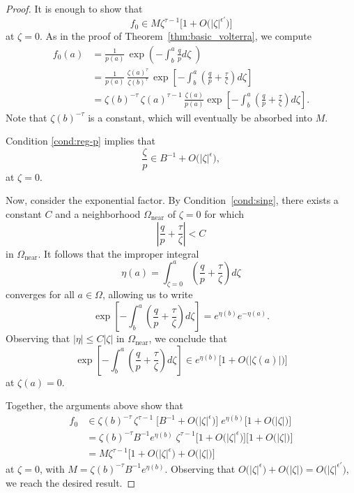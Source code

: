 \documentclass{article}
\theoremstyle{definition}
\theoremstyle{plain}
\newcommand{\solproto}{f_0}
\newcommand{\domain}{\Omega}
\newcommand{\near}{\Omega_\text{near}}
\begin{document}
\begin{proof}
It is enough to show that
\[ \solproto \in M\zeta^{\tau-1} \Big[1 + O\big(|\zeta|^{\epsilon'}\big)\Big] \]
at $\zeta = 0$. As in the proof of Theorem~\ref{thm:basic_volterra}, we compute
\begin{align*}
\solproto(a)&=\frac{1}{p(a)}\, \exp\left(-\int_b^a\frac{q}{p} d\zeta\;\right)\\
& = \frac{1}{p(a)}\,\frac{\zeta(a)^{\tau}}{\zeta(b)^{\tau}}\,\exp\left[-\int_b^a \left(\frac{q}{p}+\frac{\tau}{\zeta}\right) d\zeta\right]\\
& = \zeta(b)^{-\tau}\,\zeta(a)^{\tau-1}\,\frac{\zeta(a)}{p(a)} \exp\left[-\int_b^a\left(\frac{q}{p}+\frac{\tau}{\zeta}\right) d\zeta\right].
\end{align*}
Note that $\zeta(b)^{-\tau}$ is a constant, which will eventually be absorbed into $M$.

Condition \eqref{cond:reg-p} implies that
\[ \frac{\zeta}{p} \in B^{-1} + O\big(|\zeta|^{\epsilon}\big), \]
at $\zeta = 0$.

Now, consider the exponential factor. By Condition~\eqref{cond:sing}, there exists a constant $C$ and a neighborhood $\domain_\text{near}$ of $\zeta = 0$ for which
\[ \left| \frac{q}{p}+\frac{\tau}{\zeta} \right| < C \]
in $\domain_\text{near}$. It follows that the improper integral
\[ \eta(a) = \int_{\zeta = 0}^a \left(\frac{q}{p}+\frac{\tau}{\zeta}\right) d\zeta \]
converges for all $a \in \domain$, allowing us to write
\[ \exp\left[-\int_b^a\left(\frac{q}{p}+\frac{\tau}{\zeta}\right) d\zeta\right] = e^{\eta(b)} e^{-\eta(a)}. \]
Observing that $|\eta| \le C |\zeta|$ in $\near$, we conclude that
\[ \exp\left[-\int_b^a\left(\frac{q}{p}+\frac{\tau}{\zeta}\right) d\zeta\right] \in e^{\eta(b)} \Big[ 1 + O\big(|\zeta(a)|\big) \Big] \]
at $\zeta(a) = 0$.

Together, the arguments above show that
\begin{align*}
\solproto & \in \zeta(b)^{-\tau}\,\zeta^{\tau-1}\;\Big[ B^{-1} + O\big(|\zeta|^{\epsilon}\big) \Big]\;e^{\eta(b)} \Big[1 + O\big(|\zeta|\big) \Big] \\
& = \zeta(b)^{-\tau} B^{-1} e^{\eta(b)}\;\zeta^{\tau-1} \Big[ 1 + O\big(|\zeta|^{\epsilon}\big) \Big] \Big[1 + O\big(|\zeta|\big) \Big] \\
& = M\zeta^{\tau-1} \Big[ 1 + O\big(|\zeta|^{\epsilon}\big) + O\big(|\zeta|\big) \Big]
\end{align*}
at $\zeta = 0$, with $M = \zeta(b)^{-\tau} B^{-1} e^{\eta(b)}$. Observing that $O\big(|\zeta|^{\epsilon}\big) + O\big(|\zeta|\big) = O\big(|\zeta|^{\epsilon'}\big)$, we reach the desired result.
\end{proof}
\end{document}
